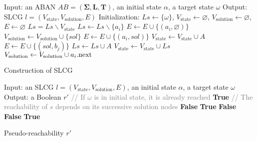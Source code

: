 \documentclass[runningheads]{llncs}
\begin{document}
\begin{algorithm}[ht]
\begin{algorithmic}
\State Input: an ABAN $AB=(\mathbf{\Sigma},\mathbf{L},\mathbf{T})$, an initial state $\alpha$, a target state $\omega$
\State Output: SLCG $l=(V_{\mathrm{state}},V_{\mathrm{solution}}, E)$
\State Initialization: 
$Ls\gets \{\omega\}$, $V_{\mathrm{state}}\gets\varnothing$, $V_{\mathrm{solution}}\gets \varnothing$, $E\gets \varnothing$
    \State $Ls=Ls\backslash V_{\mathrm{state}}$
		\State $Ls\gets Ls\backslash \{a_i\}$
			\State $E\gets E\cup \{(a_i,\varnothing)\} $
    	\Else
    		    \State $V_{\mathrm{solution}}\gets V_{\mathrm{solution}}\cup \{sol\}$
    		    \State $E\gets E\cup \{(a_i,sol)\} $
    			\State $V_{\mathrm{state}}\gets V_{\mathrm{state}}\cup {A}$
    				\State $E\gets E\cup \{(sol,b_j)\} $
    			\EndFor
    			\State $Ls\gets Ls\cup A$
                \State $V_{\mathrm{state}}\gets V_{\mathrm{state}}\cup Ls$
    		\EndFor
    		\State$V_{\mathrm{solution}}\gets V_{\mathrm{solution}}\cup a_i{\rm .next}$           
    	\EndIf
	\EndFor
\EndWhile
\State{}
\end{algorithmic}
\caption{Construction of SLCG}\label{AlgConstructLCG}
\end{algorithm}

\begin{algorithm}[ht]
\begin{algorithmic}
\State Input: an SLCG $l=(V_{\mathrm{state}}, {V_\mathrm{solution}},E)$, an initial state $\alpha$, a target state $\omega$
\State Output: a Boolean $r'$
\State \textcolor{gray}{// If $\omega$ is in initial state, it is already reached}
\If {$\omega\in \alpha$}
   \Return \textbf{True}
\EndIf
\State \textcolor{gray}{// The reachability of $s$ depends on its successive solution nodes}
    \Return \textbf{False}
\EndIf
{}
    \Return \textbf{True}
    \EndIf
\EndFor
 \Return \textbf{False}
\EndProcedure
{}
    \Return \textbf{False}
    \EndIf
\EndFor
\Return \textbf{True}
\EndProcedure
\end{algorithmic}
\caption{Pseudo-reachability $r'$}\label{algPseudo}
\end{algorithm}
\end{document}
